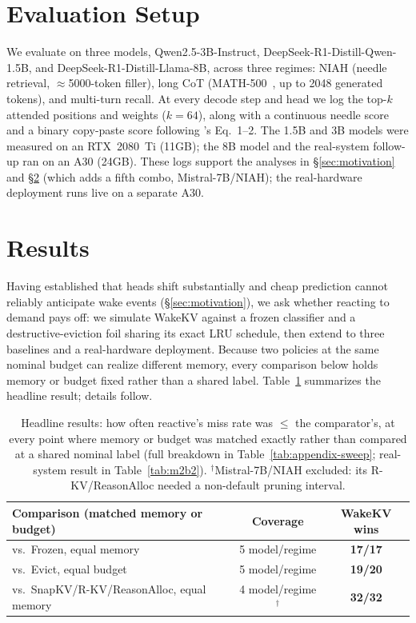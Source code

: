 \documentclass{article}
\begin{document}
\section{Evaluation Setup}
\label{sec:setup}

We evaluate on three models, Qwen2.5-3B-Instruct,
DeepSeek-R1-Distill-Qwen-1.5B, and DeepSeek-R1-Distill-Llama-8B, across
three regimes: NIAH (needle retrieval, $\approx$5000-token filler),
long CoT (MATH-500~\cite{math500}, up to 2048 generated tokens), and
multi-turn recall. At every decode step and head we log the top-$k$
attended positions and weights ($k=64$), along with a continuous
needle score and a binary copy-paste score following
\cite{retrievalheadsdynamic}'s Eq.~1--2. The 1.5B and 3B models were
measured on an RTX~2080~Ti (11GB); the 8B model and the real-system
follow-up ran on an A30 (24GB). These logs support the analyses in
\S\ref{sec:motivation} and \S\ref{sec:results} (which adds a fifth
combo, Mistral-7B/NIAH); the real-hardware deployment runs live on a
separate A30.

\section{Results}
\label{sec:results}

Having established that heads shift substantially and cheap
prediction cannot reliably anticipate wake events
(\S\ref{sec:motivation}), we ask whether reacting to demand pays off:
we simulate WakeKV against a frozen classifier and a
destructive-eviction foil sharing its exact LRU schedule, then extend
to three baselines and a real-hardware deployment. Because two
policies at the same nominal budget can realize different memory,
every comparison below holds memory or budget fixed rather than a
shared label. Table~\ref{tab:results} summarizes the headline result;
details follow.

\begin{table}[h]
\centering
\footnotesize
\begin{tabular}{lcc}
\toprule
Comparison (matched memory or budget) & Coverage & WakeKV wins \\
\midrule
vs.\ Frozen, equal memory & 5 model/regime & \textbf{17/17} \\
vs.\ Evict, equal budget & 5 model/regime & \textbf{19/20} \\
vs.\ SnapKV/R-KV/ReasonAlloc, equal memory & 4 model/regime$^\dagger$ & \textbf{32/32} \\
\bottomrule
\end{tabular}
\caption{Headline results: how often reactive's miss rate was $\leq$
the comparator's, at every point where memory or budget was matched
exactly rather than compared at a shared nominal label (full breakdown
in Table~\ref{tab:appendix-sweep}; real-system result in
Table~\ref{tab:m2b2}). $^\dagger$Mistral-7B/NIAH excluded: its
R-KV/ReasonAlloc needed a non-default pruning interval.}
\label{tab:results}
\end{table}
\end{document}

